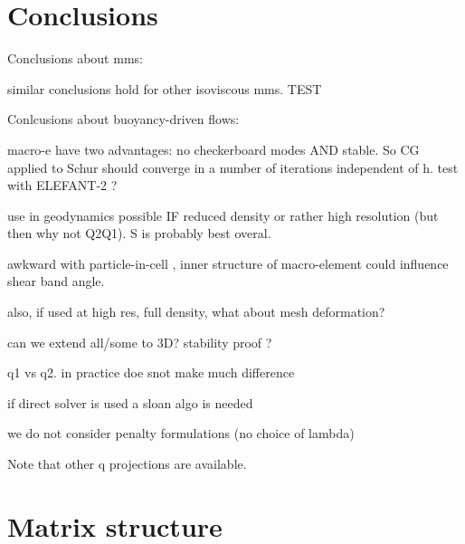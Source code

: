 \documentclass[a4paper]{article}
\begin{document}
\section{Conclusions}\label{sec5}

Conclusions about mms:

similar conclusions hold for other isoviscous mms. TEST




Conlcusions about buoyancy-driven flows:

macro-e have two advantages: no checkerboard modes AND stable. So CG applied to Schur should converge in a number of iterations independent of h. test with ELEFANT-2 ?

use in geodynamics possible IF reduced density or rather high resolution (but then why not Q2Q1). S is probably best overal.

awkward with particle-in-cell , inner structure of macro-element could influence shear band angle. 

also, if used at high res, full density, what about mesh deformation?

can we extend all/some to 3D? stability proof ?

q1 vs q2. in practice doe snot make much difference

if direct solver is used a sloan algo is needed

we do not consider penalty formulations (no choice of lambda)

Note that other q projections are available.





\printbibliography

\newpage
\section{Matrix structure}
\end{document}
